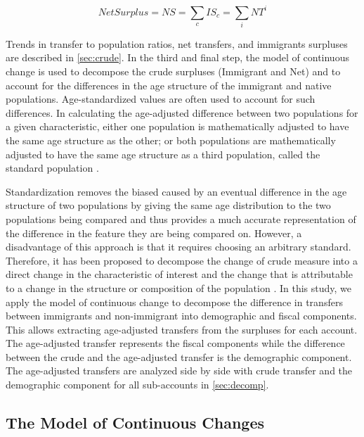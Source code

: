 \begin{equation}\label{eq:ns}
  Net Surplus = NS = \displaystyle\sum_{c}IS_{c} = \displaystyle\sum_{i}NT^{i}
\end{equation}

Trends in transfer to population ratios, net transfers, and immigrants surpluses are described in \autoref{sec:crude}.
In the third and final step, the model of continuous change \citep{Horiuchi:2008cn} is used to decompose the crude surpluses (Immigrant and Net) and to account for the differences in the age structure of the immigrant and native populations.
Age-standardized values are often used to account for such differences.
In calculating the age-adjusted difference between two populations for a given characteristic, either one population is mathematically adjusted to have the same age structure as the other; or both populations are mathematically adjusted to have the same age structure as a third population, called the standard population \citep{statCan:001}.

\vspace{0.7em}\par
Standardization removes the biased caused by an eventual difference in the age structure of two populations by giving the same age distribution to the two populations being compared and thus provides a much accurate representation of the difference in the feature they are being compared on.
However, a disadvantage of this approach is that it requires choosing an arbitrary standard.
Therefore, it has been proposed to decompose the change of crude measure into a direct change in the characteristic of interest and the change that is attributable to a change in the structure or composition of the population \citep{Prskawetz:2005dx}.
In this study, we apply the model of continuous change \citep{Horiuchi:2008cn} to decompose the difference in transfers between immigrants and non-immigrant into demographic and fiscal components.
This allows extracting age-adjusted transfers from the surpluses for each account.
The age-adjusted transfer represents the fiscal components while the difference between the crude and the age-adjusted transfer is the demographic component.
The age-adjusted transfers are analyzed side by side with crude transfer and the demographic component for all sub-accounts in \autoref{sec:decomp}.

\subsection{The Model of Continuous Changes}\label{sec:model}

